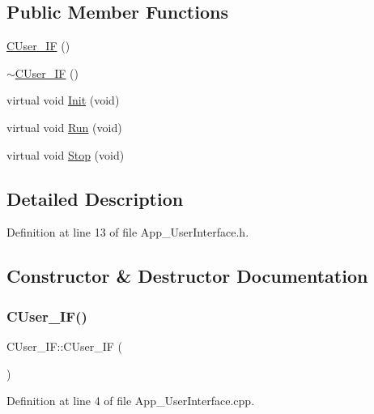 \subsection*{Public Member Functions}
\begin{DoxyCompactItemize}
\item 
\mbox{\hyperlink{class_c_user___i_f_a417b492fc7368c7d5dde59587f4b3e65}{C\+User\+\_\+\+IF}} ()
\item 
\mbox{\hyperlink{class_c_user___i_f_a35f3408f44d101a06e184311cab14cba}{$\sim$\+C\+User\+\_\+\+IF}} ()
\item 
virtual void \mbox{\hyperlink{class_c_user___i_f_a02c8bba754c77583dc5afaa6877dc547}{Init}} (void)
\item 
virtual void \mbox{\hyperlink{class_c_user___i_f_a1be2e11cd5df5ad0fa5a74a0eb283ec5}{Run}} (void)
\item 
virtual void \mbox{\hyperlink{class_c_user___i_f_ae241b3296f4dd7810897ed8631ede880}{Stop}} (void)
\end{DoxyCompactItemize}


\subsection{Detailed Description}


Definition at line 13 of file App\+\_\+\+User\+Interface.\+h.



\subsection{Constructor \& Destructor Documentation}
\mbox{\label{class_c_user___i_f_a417b492fc7368c7d5dde59587f4b3e65}} 
\subsubsection{\texorpdfstring{C\+User\+\_\+\+I\+F()}{CUser\_IF()}}
{\footnotesize\ttfamily C\+User\+\_\+\+I\+F\+::\+C\+User\+\_\+\+IF (\begin{DoxyParamCaption}{ }\end{DoxyParamCaption})}



Definition at line 4 of file App\+\_\+\+User\+Interface.\+cpp.

